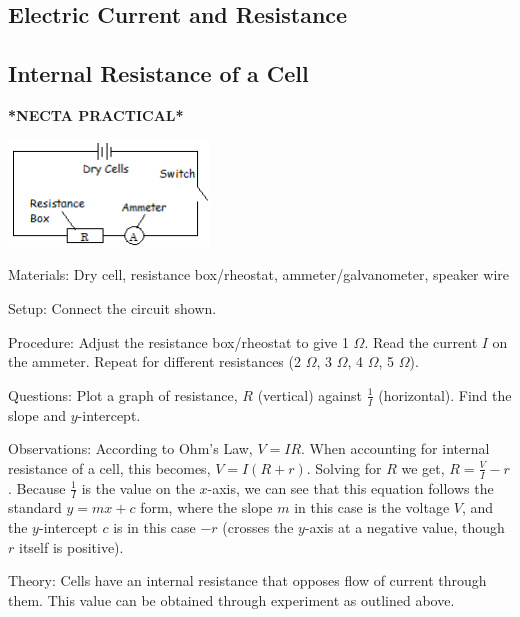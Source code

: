 \begin{multicols}{2}
\vfill
\columnbreak


\section*{Electric Current and Resistance}


\subsection{Internal Resistance of a Cell}
\textbf{*NECTA PRACTICAL*}

\begin{center}
\includegraphics[width=0.4\textwidth]{./img/ohms-law.png}
\end{center}

\begin{description*}
\item[Materials:]{Dry cell, resistance box/rheostat, ammeter/galvanometer, speaker wire}
\item[Setup:]{Connect the circuit shown.}
\item[Procedure:]{Adjust the resistance box/rheostat to give 1 $\Omega$. Read the current $I$ on the ammeter. Repeat for different resistances (2 $\Omega$, 3 $\Omega$, 4 $\Omega$, 5 $\Omega$).}
\item[Questions:]{Plot a graph of resistance, $R$ (vertical) against $\frac{1}{I}$ (horizontal). Find the slope and $y$-intercept.}
\item[Observations:]{According to Ohm's Law, $V = IR$. When accounting for internal resistance of a cell, this becomes, $V = I(R + r)$. Solving for $R$ we get, $R = \frac{V}{I} - r$. Because $\frac{1}{I}$ is the value on the $x$-axis, we can see that this equation follows the standard $y=mx+c$ form, where the slope $m$ in this case is the voltage $V$, and the $y$-intercept $c$ is in this case $-r$ (crosses the $y$-axis at a negative value, though $r$ itself is positive).}
\item[Theory:]{Cells have an internal resistance that opposes flow of current through them. This value can be obtained through experiment as outlined above.}
\end{description*}


\end{multicols}
